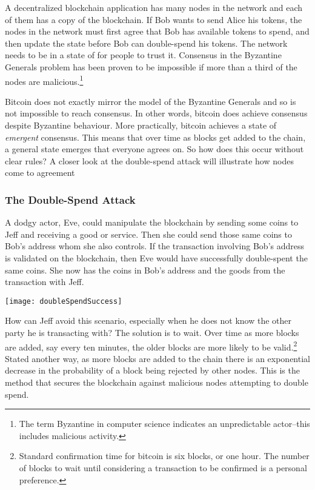 A decentralized blockchain application has many nodes in the network and each of them has a copy of the blockchain. If Bob wants to send Alice his tokens, the nodes in the network must first agree that Bob has available tokens to spend, and then update the state before Bob can double-spend his tokens. The network needs to be in a state of  for people to trust it. Consensus in the Byzantine Generals problem has been proven to be impossible if more than a third of the nodes are malicious.\footnote{The term Byzantine in computer science indicates an unpredictable actor--this includes malicious activity.}

Bitcoin does not exactly mirror the model of the Byzantine Generals and so is not impossible to reach consensus. In other words, bitcoin does achieve consensus despite Byzantine behaviour. More practically, bitcoin achieves a state of \textit{emergent} consensus. This means that over time as blocks get added to the chain, a general state emerges that everyone agrees on. So how does this occur without clear rules? A closer look at the double-spend attack will illustrate how nodes come to agreement

\subsubsection*{The Double-Spend Attack}
A dodgy actor, Eve, could manipulate the blockchain by sending some coins to Jeff and receiving a good or service. Then she could send those same coins to Bob's address whom she also controls. If the transaction involving Bob's address is validated on the blockchain, then Eve would have successfully double-spent the same coins. She now has the coins in Bob's address and the goods from the transaction with Jeff.\\
\begin{center}
\texttt{[image: doubleSpendSuccess]}
\end{center}
How can Jeff avoid this scenario, especially when he does not know the other party he is transacting with? The solution is to wait. Over time as more blocks are added, say every ten minutes, the older blocks are more likely to be valid.\footnote{Standard confirmation time for bitcoin is six blocks, or one hour. The number of blocks to wait until considering a transaction to be confirmed is a personal preference.} Stated another way, as more blocks are added to the chain there is an exponential decrease in the probability of a block being rejected by other nodes. This is the method that secures the blockchain against malicious nodes attempting to double spend. 

